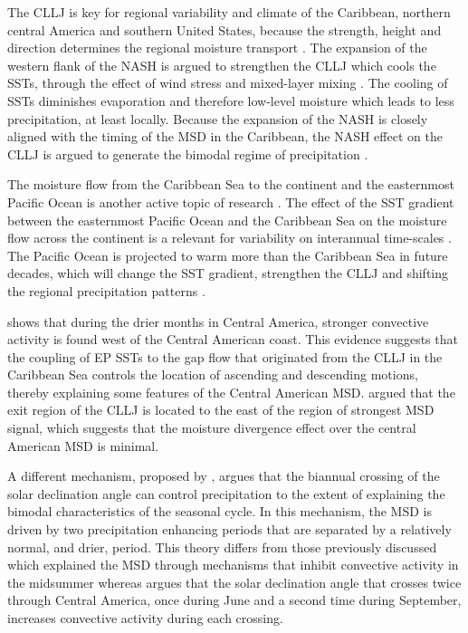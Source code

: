  The CLLJ is key for regional variability and climate of the Caribbean, northern central America and southern United States, because the strength, height and direction determines the regional moisture transport \citep{giannini2000,martinez2019,garcia2020sub}. 
 The expansion of the western flank of the NASH is argued to strengthen the CLLJ which cools the SSTs, through the effect of wind stress and mixed-layer mixing \citep{gamble2008,martinez2019}.
The cooling of SSTs diminishes evaporation and therefore low-level moisture which leads to less precipitation, at least locally. Because the expansion of the NASH is closely aligned with the timing of the MSD in the Caribbean, the NASH effect on the CLLJ is argued to generate the bimodal regime of precipitation \citep{gamble2008,martinez2019}.

The moisture flow from the Caribbean Sea to the continent and the easternmost Pacific Ocean is another active topic of research \citep{hidalgo2015,corrales2020}. The effect of the SST gradient between the easternmost Pacific Ocean and the Caribbean Sea on the
  moisture flow across the continent is a relevant for variability on interannual time-scales \citep{martinez2020}. The Pacific Ocean is projected to warm more than the Caribbean Sea in future decades, which will change the SST gradient, strengthen the CLLJ and shifting the regional precipitation patterns \citep{corrales2020}.
  
 \cite{herrera2015} shows that during the drier months in Central America, stronger convective activity is found west of the Central American coast.  This evidence suggests that the coupling of EP SSTs to the gap flow that originated from the CLLJ in the Caribbean Sea controls the location of ascending and descending motions, thereby explaining some features of the Central American MSD. 
\cite{herrera2015} argued that the exit region of the CLLJ is located to the east of the region of strongest MSD signal, which suggests that the moisture divergence effect over the central American MSD is minimal. 



A different mechanism, proposed by \cite{karnauskas2013}, argues that the biannual crossing of the solar declination angle can control precipitation to the extent of explaining the bimodal characteristics of the seasonal cycle. In this mechanism, the MSD is driven by two precipitation enhancing periods that are separated by a relatively normal, and drier, period. This theory differs from those previously discussed which explained the MSD through mechanisms that inhibit convective activity in the midsummer whereas \cite{karnauskas2013} argues that the solar declination angle that crosses twice through Central America, once during June and a second time during September, increases convective activity during each crossing. 

